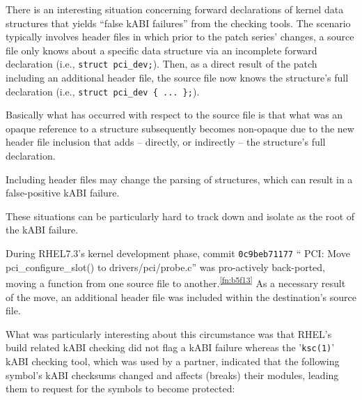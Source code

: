 \documentclass[10pt,oneside,english]{book}
\begin{document}
There is an interesting situation concerning forward declarations
of kernel data structures that yields ``false kABI failures'' from
the checking tools. The scenario typically involves header files in
which prior to the patch series' changes, a source file only knows
about a specific data structure via an incomplete forward declaration
(i.e., \texttt{struct pci\_dev;}). Then, as a direct result of the
patch including an additional header file, the source file now knows
the structure's full declaration (i.e., \texttt{struct pci\_dev \{
... \};}).

Basically what has occurred with respect to the source file is that
what was an opaque reference to a structure subsequently becomes non-opaque
due to the new header file inclusion that adds -- directly, or indirectly
-- the structure's full declaration.

Including header files may change the parsing of structures, which
can result in a false-positive kABI failure.

These situations can be particularly hard to track down and isolate
as the root of the kABI failure.

During RHEL7.3's kernel development phase, commit \texttt{0c9beb71177}
`` PCI: Move pci\_configure\_slot() to drivers/pci/probe.c'' was
pro-actively back-ported, moving a function from one source file to
another.\textsuperscript{\ref{fn:b5f13}} As a necessary result of
the move, an additional header file was included within the destination's
source file.


What was particularly interesting about this circumstance was that
RHEL's build related kABI checking did not flag a kABI failure whereas
the '\texttt{ksc(1)}' kABI checking tool, which was used by a partner,
indicated that the following symbol's kABI checksums changed and affects
(breaks) their modules, leading them to request for the symbols to
become protected:
\end{document}
